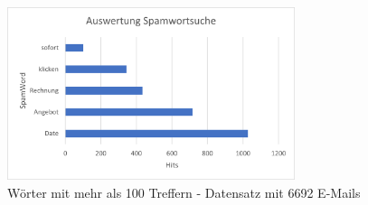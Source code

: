 \begin{figure}
    \centering
    \includegraphics[width=0.75\textwidth]{images/Merged_Auswertung_Spamwortsuche.png}
    \caption{Wörter mit mehr als 100 Treffern - Datensatz mit 6692 E-Mails} 
    \label{fig:spamwortlistegreater100merged}
\end{figure}